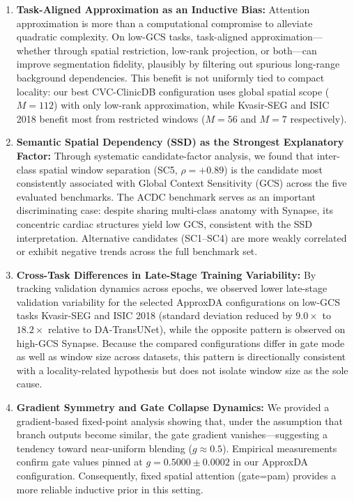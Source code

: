 \begin{enumerate}
  \item \textbf{Task-Aligned Approximation as an Inductive Bias:} Attention approximation is more than a computational compromise to alleviate quadratic complexity. On low-GCS tasks, task-aligned approximation---whether through spatial restriction, low-rank projection, or both---can improve segmentation fidelity, plausibly by filtering out spurious long-range background dependencies. This benefit is not uniformly tied to compact locality: our best CVC-ClinicDB configuration uses global spatial scope ($M{=}112$) with only low-rank approximation, while Kvasir-SEG and ISIC 2018 benefit most from restricted windows ($M{=}56$ and $M{=}7$ respectively).
  \item \textbf{Semantic Spatial Dependency (SSD) as the Strongest Explanatory Factor:} Through systematic candidate-factor analysis, we found that inter-class spatial window separation (SC5, $\rho{=}+0.89$) is the candidate most consistently associated with Global Context Sensitivity (GCS) across the five evaluated benchmarks. The ACDC benchmark serves as an important discriminating case: despite sharing multi-class anatomy with Synapse, its concentric cardiac structures yield low GCS, consistent with the SSD interpretation. Alternative candidates (SC1--SC4) are more weakly correlated or exhibit negative trends across the full benchmark set.
  \item \textbf{Cross-Task Differences in Late-Stage Training Variability:} By tracking validation dynamics across epochs, we observed lower late-stage validation variability for the selected ApproxDA configurations on low-GCS tasks Kvasir-SEG and ISIC 2018 (standard deviation reduced by $9.0\times$ to $18.2\times$ relative to DA-TransUNet), while the opposite pattern is observed on high-GCS Synapse. Because the compared configurations differ in gate mode as well as window size across datasets, this pattern is directionally consistent with a locality-related hypothesis but does not isolate window size as the sole cause.
  \item \textbf{Gradient Symmetry and Gate Collapse Dynamics:} We provided a gradient-based fixed-point analysis showing that, under the assumption that branch outputs become similar, the gate gradient vanishes---suggesting a tendency toward near-uniform blending ($g \approx 0.5$). Empirical measurements confirm gate values pinned at $g{=}0.5000 \pm 0.0002$ in our ApproxDA configuration. Consequently, fixed spatial attention (gate=pam) provides a more reliable inductive prior in this setting.
\end{enumerate}

